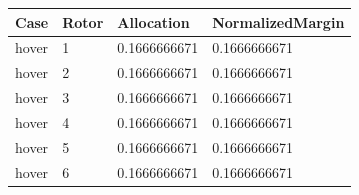 \begin{tabular}{@{}llll@{}}
\toprule
Case & Rotor & Allocation & NormalizedMargin \\
\midrule
hover & 1 & 0.1666666671 & 0.1666666671 \\
hover & 2 & 0.1666666671 & 0.1666666671 \\
hover & 3 & 0.1666666671 & 0.1666666671 \\
hover & 4 & 0.1666666671 & 0.1666666671 \\
hover & 5 & 0.1666666671 & 0.1666666671 \\
hover & 6 & 0.1666666671 & 0.1666666671 \\
\bottomrule
\end{tabular}
